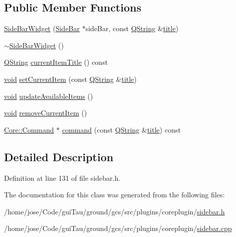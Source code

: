 \subsection*{Public Member Functions}
\begin{DoxyCompactItemize}
\item 
\hyperlink{group___core_plugin_ga05b9f381c803ca75f9a413b708dc6543}{Side\-Bar\-Widget} (\hyperlink{class_core_1_1_side_bar}{Side\-Bar} $\ast$side\-Bar, const \hyperlink{group___u_a_v_objects_plugin_gab9d252f49c333c94a72f97ce3105a32d}{Q\-String} \&\hyperlink{_parse_e_k_f_log_8m_a5df555a5fed35967e041e4abd1269b4e}{title})
\item 
\hyperlink{group___core_plugin_ga03a53332691935e2f86144d2f01f7122}{$\sim$\-Side\-Bar\-Widget} ()
\item 
\hyperlink{group___u_a_v_objects_plugin_gab9d252f49c333c94a72f97ce3105a32d}{Q\-String} \hyperlink{group___core_plugin_ga616b42637031be9467727f8aafc3688c}{current\-Item\-Title} () const 
\item 
\hyperlink{group___u_a_v_objects_plugin_ga444cf2ff3f0ecbe028adce838d373f5c}{void} \hyperlink{group___core_plugin_gac0171c31bb1c43972964719b80d90bd3}{set\-Current\-Item} (const \hyperlink{group___u_a_v_objects_plugin_gab9d252f49c333c94a72f97ce3105a32d}{Q\-String} \&\hyperlink{_parse_e_k_f_log_8m_a5df555a5fed35967e041e4abd1269b4e}{title})
\item 
\hyperlink{group___u_a_v_objects_plugin_ga444cf2ff3f0ecbe028adce838d373f5c}{void} \hyperlink{group___core_plugin_ga38a71241994574323683189ac604d0ce}{update\-Available\-Items} ()
\item 
\hyperlink{group___u_a_v_objects_plugin_ga444cf2ff3f0ecbe028adce838d373f5c}{void} \hyperlink{group___core_plugin_ga3d37b6d895d022af1fe5cbd59b3c799e}{remove\-Current\-Item} ()
\item 
\hyperlink{class_core_1_1_command}{Core\-::\-Command} $\ast$ \hyperlink{group___core_plugin_ga312aa5e5e65485860c3134e9d8f774f1}{command} (const \hyperlink{group___u_a_v_objects_plugin_gab9d252f49c333c94a72f97ce3105a32d}{Q\-String} \&\hyperlink{_parse_e_k_f_log_8m_a5df555a5fed35967e041e4abd1269b4e}{title}) const 
\end{DoxyCompactItemize}


\subsection{Detailed Description}


Definition at line 131 of file sidebar.\-h.



The documentation for this class was generated from the following files\-:\begin{DoxyCompactItemize}
\item 
/home/jose/\-Code/gui\-Tau/ground/gcs/src/plugins/coreplugin/\hyperlink{sidebar_8h}{sidebar.\-h}\item 
/home/jose/\-Code/gui\-Tau/ground/gcs/src/plugins/coreplugin/\hyperlink{sidebar_8cpp}{sidebar.\-cpp}\end{DoxyCompactItemize}
